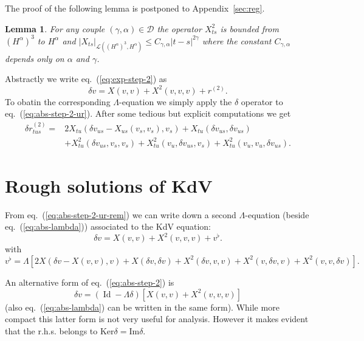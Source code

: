 \documentclass[a4paper,11pt,reqno]{article}
\newcommand{\der}{\delta}
\newcommand{\DD}{\mathcal{D}}
\newcommand{\LL}{\mathcal{L}}
\DeclareMathOperator{\id}{\text{Id}}
\newtheorem{lemma}[theorem]{Lemma}
\begin{document}
The proof of the following lemma is postponed to Appendix~\ref{sec:reg}.
\begin{lemma}
\label{lemma:X2}
For any couple
$(\gamma,\alpha) \in \DD$ 
the operator $X^2_{ts}$ is bounded from $(H^{\alpha})^3$ to
$H^{\alpha}$ and
$
|X_{ts}|_{\LL((H^{\alpha})^3,H^{\alpha})} \le C_{\gamma,\alpha} |t-s|^{2\gamma}
$
where the constant $C_{\gamma,\alpha}$ depends only on $\alpha$ and $\gamma$.
\end{lemma}

\bigskip
Abstractly we write eq.~(\ref{eq:exp-step-2}) as
\begin{equation}
  \label{eq:abs-step-2-ur}
\der v = X(v,v) + X^2(v,v,v) + r^{(2)}.  
\end{equation}
To obatin the corresponding $\Lambda$-equation  we simply apply the $\der$ operator to
eq.~(\ref{eq:abs-step-2-ur}). After some tedious but explicit
computations we get
\begin{equation}
  \label{eq:abs-step-2-ur-rem}
  \begin{split}
\der r^{(2)}_{tus} = & 2 X_{tu}(\der v_{us}- X_{us}(v_s,v_s),v_s) 
+ X_{tu}(\der v_{us},\der v_{us}) 
\\ & + X^2_{tu}(\der v_{us},v_s,v_s) +
X^2_{tu}(v_u,\der v_{us},v_s) + X^2_{tu}( v_u,v_u,\der v_{us}).     
  \end{split}
\end{equation}

\section{Rough solutions of KdV}
\label{sec:rough}
From eq.~(\ref{eq:abs-step-2-ur-rem}) we can write down
 a second $\Lambda$-equation (beside eq.~(\ref{eq:abs-lambda})) associated to the KdV equation:
\begin{equation}
  \label{eq:abs-step-2}
\der v = X(v,v) + X^2(v,v,v) + v^\flat.  
\end{equation}
with
$$
v^\flat = \Lambda[ 2 X(\der v- X(v,v),v) 
+ X(\der v,\der v) 
 + X^2(\der v,v,v) +
X^2(v,\der v,v) + X^2( v,v,\der v)   ].
$$

An alternative form of eq.~(\ref{eq:abs-step-2}) is
\begin{equation}
  \label{eq:abs-step-2-compact}
\der v = (\id - \Lambda \der)[X(v,v)+X^2(v,v,v)]
\end{equation}
(also eq.~(\ref{eq:abs-lambda}) can be written in the same
form). While more compact this latter form is not very useful for
analysis. However it makes evident that the r.h.s. belongs to $\text{Ker} \der = \text{Im} \der$.
\end{document}
